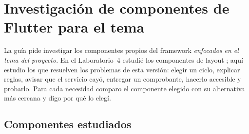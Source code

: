 \section{Investigación de componentes de Flutter para el tema}
\label{sec:componentes}

La guía pide investigar los componentes propios del framework \emph{enfocados en el tema del proyecto}. En el Laboratorio~4 estudié los componentes de layout \cite{lab4}; aquí estudio los que resuelven los problemas de esta versión: elegir un ciclo, explicar reglas, avisar que el servicio cayó, entregar un comprobante, hacerlo accesible y probarlo. Para cada necesidad comparo el componente elegido con su alternativa más cercana y digo por qué lo elegí.

\subsection{Componentes estudiados}
